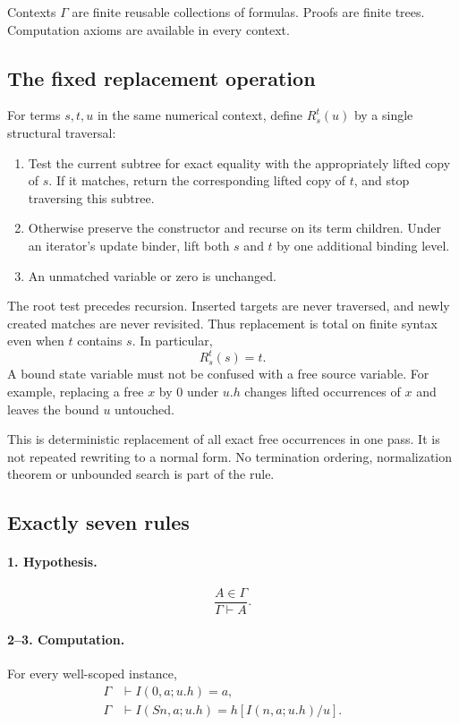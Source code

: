 \documentclass[11pt,letterpaper]{article}
\theoremstyle{definition}
\theoremstyle{remark}
\newcommand{\Rep}[3]{R_{#1}^{#2}(#3)}
\begin{document}
Contexts $\Gamma$ are finite reusable collections of formulas. Proofs are
finite trees. Computation axioms are available in every context.

\subsection{The fixed replacement operation}
\label{new:replacement}

For terms $s,t,u$ in the same numerical context, define $\Rep{s}{t}{u}$
by a single structural traversal:
\begin{enumerate}
\item Test the current subtree for exact equality with the appropriately
lifted copy of $s$. If it matches, return the corresponding lifted copy
of $t$, and stop traversing this subtree.
\item Otherwise preserve the constructor and recurse on its term
children. Under an iterator's update binder, lift both $s$ and $t$ by
one additional binding level.
\item An unmatched variable or zero is unchanged.
\end{enumerate}
The root test precedes recursion. Inserted targets are never traversed,
and newly created matches are never revisited. Thus replacement is
total on finite syntax even when $t$ contains $s$. In particular,
\[
                    \Rep{s}{t}{s}=t.
\]
A bound state variable must not be confused with a free source variable.
For example, replacing a free $x$ by $0$ under $u.h$ changes lifted
occurrences of $x$ and leaves the bound $u$ untouched.

This is deterministic replacement of all exact free occurrences in one
pass. It is not repeated rewriting to a normal form. No termination
ordering, normalization theorem or unbounded search is part of the rule.

\subsection{Exactly seven rules}

\paragraph{1. Hypothesis.}
\[
 \frac{A\in\Gamma}{\Gamma\vdash A}. \tag{Hyp}
\]

\paragraph{2--3. Computation.}
For every well-scoped instance,
\begin{align*}
 \Gamma&\vdash I(0,a;u.h)=a, &&\tag{$I_0$}\\
 \Gamma&\vdash I(Sn,a;u.h)=h[I(n,a;u.h)/u]. &&\tag{$I_S$}
\end{align*}
\end{document}
